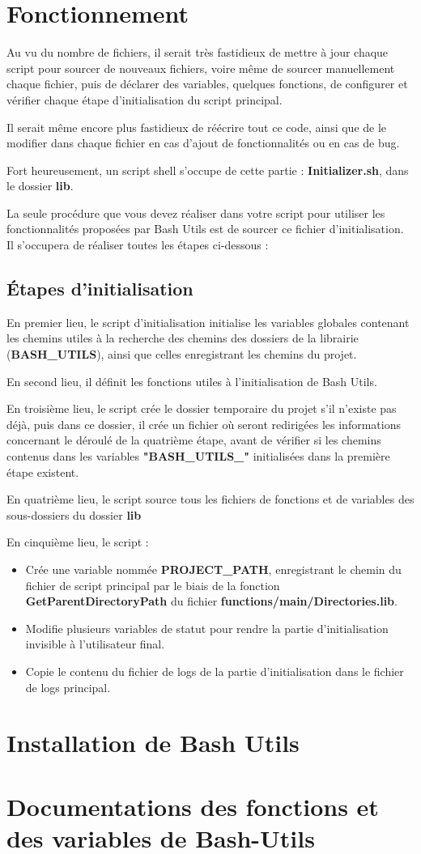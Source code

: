 \documentclass[a4paper,10pt]{article}
\begin{document}
\section{Fonctionnement}
Au vu du nombre de fichiers, il serait très fastidieux de mettre à jour chaque script pour sourcer de nouveaux fichiers, voire même de sourcer manuellement chaque fichier, puis de déclarer des variables, quelques fonctions, de configurer et vérifier chaque étape d'initialisation du script principal.

Il serait même encore plus fastidieux de réécrire tout ce code, ainsi que de le modifier dans chaque fichier en cas d'ajout de fonctionnalités ou en cas de bug.

Fort heureusement, un script shell s'occupe de cette partie : \textbf{Initializer.sh}, dans le dossier \textbf{lib}.

La seule procédure que vous devez réaliser dans votre script pour utiliser les fonctionnalités proposées par Bash Utils est de sourcer ce fichier d'initialisation. Il s'occupera de réaliser toutes les étapes ci-dessous :

\subsection{Étapes d'initialisation}
En premier lieu, le script d'initialisation initialise les variables globales contenant les chemins utiles à la recherche des chemins des dossiers de la librairie (\textbf{BASH\_UTILS}), ainsi que celles enregistrant les chemins du projet.

En second lieu, il définit les fonctions utiles à l'initialisation de Bash Utils.

En troisième lieu, le script crée le dossier temporaire du projet s'il n'existe pas déjà, puis dans ce dossier, il crée un fichier où seront redirigées les informations concernant le déroulé de la quatrième étape, avant de vérifier si les chemins contenus dans les variables \textbf{"BASH\_UTILS\_"} initialisées dans la première étape existent.

En quatrième lieu, le script source tous les fichiers de fonctions et de variables des sous-dossiers du dossier \textbf{lib}

En cinquième lieu, le script :
\begin{itemize}
    \item Crée une variable nommée \textbf{PROJECT\_PATH}, enregistrant le chemin du fichier de script principal par le biais de la fonction \textbf{GetParentDirectoryPath} du fichier \textbf{functions/main/Directories.lib}. 
    
    \item Modifie plusieurs variables de statut pour rendre la partie d'initialisation invisible à l'utilisateur final.
    
    \item Copie le contenu du fichier de logs de la partie d'initialisation dans le fichier de logs principal.
\end{itemize}



\section{Installation de Bash Utils}

\section{Documentations des fonctions et des variables de Bash-Utils}
\end{document}
